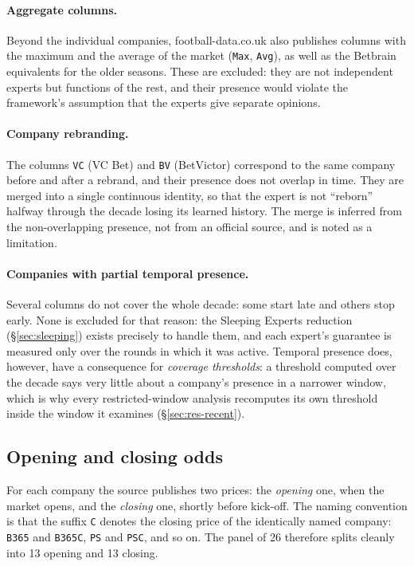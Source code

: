 \documentclass[12pt,a4paper,oneside]{report}
\newcommand{\file}[1]{\texttt{#1}}
\renewcommand{\_}{\oldunderscore\allowbreak}
\theoremstyle{definition}
\theoremstyle{plain}
\theoremstyle{remark}
\begin{document}
\paragraph{Aggregate columns.} Beyond the individual companies, football-data.co.uk also
publishes columns with the maximum and the average of the market (\file{Max}, \file{Avg}), as
well as the Betbrain equivalents for the older seasons. These are excluded: they are not
independent experts but functions of the rest, and their presence would violate the framework's
assumption that the experts give separate opinions.

\paragraph{Company rebranding.} The columns \file{VC} (VC Bet) and \file{BV} (BetVictor)
correspond to the same company before and after a rebrand, and their presence does not overlap in
time. They are merged into a single continuous identity, so that the expert is not ``reborn''
halfway through the decade losing its learned history. The merge is inferred from the
non-overlapping presence, not from an official source, and is noted as a limitation.

\paragraph{Companies with partial temporal presence.} Several columns do not cover the whole
decade: some start late and others stop early. None is excluded for that reason: the Sleeping
Experts reduction (\S\ref{sec:sleeping}) exists precisely to handle them, and each expert's
guarantee is measured only over the rounds in which it was active. Temporal presence does,
however, have a consequence for \emph{coverage thresholds}: a threshold computed over the
decade says very little about a company's presence in a narrower window, which is why every
restricted-window analysis recomputes its own threshold inside the window it examines
(\S\ref{sec:res-recent}).

\subsection{Opening and closing odds}
\label{sec:openclose}

For each company the source publishes two prices: the \emph{opening} one, when the market opens,
and the \emph{closing} one, shortly before kick-off. The naming convention is that the suffix
\file{C} denotes the closing price of the identically named company: \file{B365} and
\file{B365C}, \file{PS} and \file{PSC}, and so on. The panel of 26 therefore splits cleanly into
13 opening and 13 closing.
\end{document}
